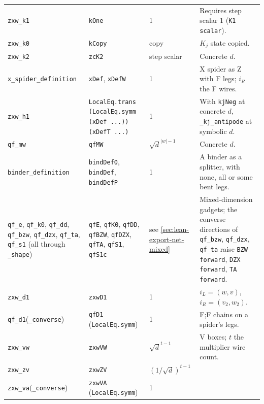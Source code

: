 {\begin{xltabular}{\linewidth}{@{}p{4.3cm}p{3.6cm}p{2.2cm}X@{}}
\texttt{zxw\_\allowbreak{}k1} & \texttt{kOne} & 1 & Requires step scalar 1 (\texttt{K1 scalar}). \\
\texttt{zxw\_\allowbreak{}k0} & \texttt{kCopy} & copy & $K_j$ state copied. \\
\texttt{zxw\_\allowbreak{}k2} & \texttt{zcK2} & step scalar & Concrete $d$. \\
\texttt{x\_\allowbreak{}spider\_\allowbreak{}definition} & \texttt{xDef}, \texttt{xDefW} & 1 & X spider as Z with F legs;
  $i_R$ the F wires. \\
\texttt{zxw\_\allowbreak{}h1} & \texttt{LocalEq.trans\textquotesingle{} (LocalEq.symm\textquotesingle{} (xDef ...)) (xDefT ...)} & 1 & With
  \texttt{kjNeg} at concrete $d$, \texttt{\_\allowbreak{}kj\_\allowbreak{}antipode} at symbolic $d$. \\
\texttt{qf\_\allowbreak{}mw} & \texttt{qfMW} & $\sqrt d^{|w|-1}$ & Concrete $d$. \\
\texttt{binder\_\allowbreak{}definition} & \texttt{bindDef0}, \texttt{bindDef}, \texttt{bindDefP} & 1 & A binder as a
  splitter, with none, all or some bent legs. \\
\texttt{qf\_\allowbreak{}e}, \texttt{qf\_\allowbreak{}k0}, \texttt{qf\_\allowbreak{}dd}, \texttt{qf\_\allowbreak{}bzw}, \texttt{qf\_\allowbreak{}dzx}, \texttt{qf\_\allowbreak{}ta},
  \texttt{qf\_\allowbreak{}s1} (all through \texttt{\_\allowbreak{}shape}) & \texttt{qfE}, \texttt{qfK0}, \texttt{qfDD}, \texttt{qfBZW},
  \texttt{qfDZX}, \texttt{qfTA}, \texttt{qfS1}, \texttt{qfS1c} & see \cref{sec:lean-export-net-mixed} &
  Mixed-dimension gadgets; the converse directions of \texttt{qf\_\allowbreak{}bzw}, \texttt{qf\_\allowbreak{}dzx}, \texttt{qf\_\allowbreak{}ta}
  raise \texttt{BZW forward}, \texttt{DZX forward}, \texttt{TA forward}. \\
\texttt{zxw\_\allowbreak{}d1} & \texttt{zxwD1} & 1 & $i_L=(w,v)$, $i_R=(v_2,w_2)$. \\
\texttt{qf\_\allowbreak{}d1}(\texttt{\_\allowbreak{}converse}) & \texttt{qfD1} (\texttt{LocalEq.symm\textquotesingle{}}) & 1 & F;F chains on a
  spider's legs. \\
\texttt{zxw\_\allowbreak{}vw} & \texttt{zxwVW} & $\sqrt d^{t-1}$ & V boxes; $t$ the multiplier wire count. \\
\texttt{zxw\_\allowbreak{}zv} & \texttt{zxwZV} & $(1/\sqrt d)^{t-1}$ & \\
\texttt{zxw\_\allowbreak{}va}(\texttt{\_\allowbreak{}converse}) & \texttt{zxwVA} (\texttt{LocalEq.symm\textquotesingle{}}) & 1 & \\

\end{xltabular}}
